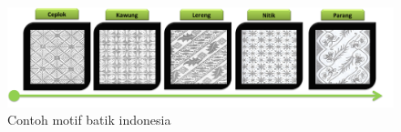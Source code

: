 \begin{figure}[htp]
	\centering
	\includegraphics[width=15cm]{pics/motif_batik}
	\caption{Contoh motif batik indonesia}
	\label{fig:motif_batik}
\end{figure}